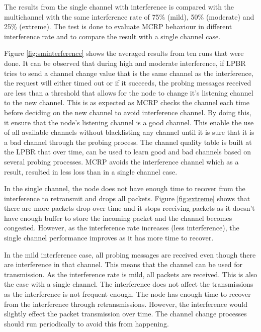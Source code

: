 The results from the single channel with interference is compared with the multichannel with the same interference rate of 75\% (mild), 50\% (moderate) and 25\% (extreme). The test is done to evaluate MCRP behaviour in different interference rate and to compare the result with a single channel case. 

Figure \ref{fig:sminterference} shows the averaged results from ten runs that were done. It can be observed that during high and moderate interference, if LPBR tries to send a channel change value that is the same channel as the interference, the request will either timed out or if it succeeds, the probing messages received are less than a threshold that allows for the node to change it's listening channel to the new channel. This is as expected as MCRP checks the channel each time before deciding on the new channel to avoid interference channel. By doing this, it ensure that the node's listening channel is a good channel. This enable the use of all available channels without blacklisting any channel until it is sure that it is a bad channel through the probing process. The channel quality table is built at the LPBR that over time, can be used to learn good and bad channels based on several probing processes. MCRP avoids the interference channel which as a result, resulted in less loss than in a single channel case. 

In the single channel, the node does not have enough time to recover from the interference to retransmit and drops all packets. Figure \ref{fig:extreme} shows that there are more packets drop over time and it stops receiving packets as it doesn't have enough buffer to store the incoming packet and the channel becomes congested. However, as the interference rate increases (less interference), the single channel performance improves as it has more time to recover.

In the mild interference case, all probing messages are received even though there are interference in that channel. This means that the channel can be used for transmission. As the interference rate is mild, all packets are received. This is also the case with a single channel. The interference does not affect the transmissions as the interference is not frequent enough. The node has enough time to recover from the interference through retransmissions. However, the interference would slightly effect the packet transmission over time. The channel change processes should run periodically to avoid this from happening.

